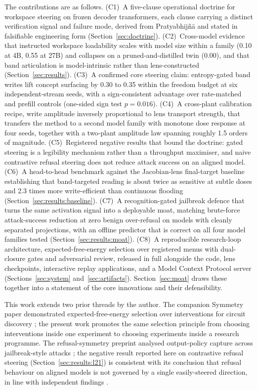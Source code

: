 The contributions are as follows. (C1)~A five-clause operational doctrine for workspace steering on frozen decoder transformers, each clause carrying a distinct verification signal and failure mode, derived from Pratyabhij\~n\=a and stated in falsifiable engineering form (Section~\ref{sec:doctrine}). (C2)~Cross-model evidence that instructed workspace loadability scales with model size within a family (0.10 at 4B, 0.55 at 27B) and collapses on a pruned-and-distilled twin (0.00), and that band articulation is model-intrinsic rather than lens-constructed (Section~\ref{sec:results}). (C3)~A confirmed core steering claim: entropy-gated band writes lift concept surfacing by 0.30 to 0.35 within the freedom budget at six independent-stream seeds, with a sign-consistent advantage over rate-matched and prefill controls (one-sided sign test $p=0.016$). (C4)~A cross-plant calibration recipe, write amplitude inversely proportional to lens transport strength, that transfers the method to a second model family with monotone dose response at four seeds, together with a two-plant amplitude law spanning roughly 1.5 orders of magnitude. (C5)~Registered negative results that bound the doctrine: gated steering is a legibility mechanism rather than a throughput maximiser, and naive contrastive refusal steering does not reduce attack success on an aligned model. (C6)~A head-to-head benchmark against the Jacobian-lens final-target baseline establishing that band-targeted reading is about twice as sensitive at subtle doses and 2.3 times more write-efficient than continuous flooding (Section~\ref{sec:results:baseline}). (C7)~A recognition-gated jailbreak defence that turns the same activation signal into a deployable moat, matching brute-force attack-success reduction at zero benign over-refusal on models with cleanly separated projections, with an offline predictor that is correct on all four model families tested (Section~\ref{sec:results:moat}). (C8)~A reproducible research-loop architecture, expected-free-energy selection over registered menus with dual-closure gates and adversarial review, released in full alongside the code, lens checkpoints, interactive replay applications, and a Model Context Protocol server (Sections~\ref{sec:system} and~\ref{sec:artifacts}). Section~\ref{sec:moat} draws these together into a statement of the core innovations and their defensibility.

This work extends two prior threads by the author. The companion Symmetry paper demonstrated expected-free-energy selection over interventions for circuit discovery \cite{Sathish2026ACD}; the present work promotes the same selection principle from choosing interventions inside one experiment to choosing experiments inside a research programme. The refusal-symmetry preprint analysed output-policy capture across jailbreak-style attacks \cite{Sathish2026Refusal}; the negative result reported here on contrastive refusal steering (Section~\ref{sec:results:l21}) is consistent with its conclusion that refusal behaviour on aligned models is not governed by a single easily-steered direction, in line with independent findings \cite{Arditi2024}.
